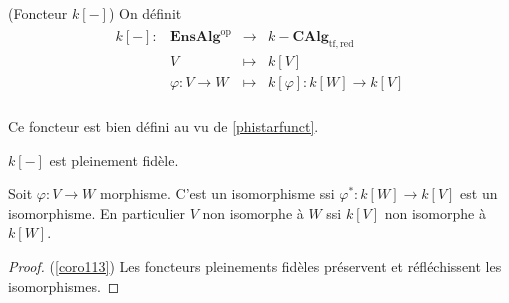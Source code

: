         \begin{defi} (Foncteur $k[-]$)
            On définit
            \begin{align*}
                \begin{array}{cccc}
                    k[-] : & \mathbf{EnsAlg}^\mathrm{op} & \to & k-\mathbf{CAlg}_\mathrm{tf, red} \\
                    & V & \mapsto & k[V] \\
                    & \varphi : V \to W & \mapsto & k[\varphi] : k[W] \to k[V] \\
                \end{array}
            \end{align*}
        \end{defi}
        Ce foncteur est bien défini au vu de \ref{phistarfunct}.
        \begin{theo}
            \label{theo115}
            $k[-]$ est pleinement fidèle.
        \end{theo}
        \begin{coro}
            \label{coro113}
            Soit $\varphi : V \to W$ morphisme. C'est un isomorphisme ssi $\varphi^* : k[W] \to k[V]$ est un isomorphisme. En particulier $V$ non isomorphe à $W$ ssi $k[V]$ non isomorphe à $k[W]$.
        \end{coro}
        \begin{proof} (\ref{coro113})
            Les foncteurs pleinements fidèles préservent et réfléchissent les isomorphismes.
        \end{proof}
